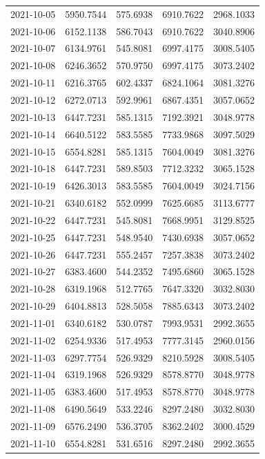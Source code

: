 {\begin{longtable}{lllll}
2021-10-05 & 5950.7544 & 575.6938 & 6910.7622 & 2968.1033 \\
2021-10-06 & 6152.1138 & 586.7043 & 6910.7622 & 3040.8906 \\
2021-10-07 & 6134.9761 & 545.8081 & 6997.4175 & 3008.5405 \\
2021-10-08 & 6246.3652 & 570.9750 & 6997.4175 & 3073.2402 \\
2021-10-11 & 6216.3765 & 602.4337 & 6824.1064 & 3081.3276 \\
2021-10-12 & 6272.0713 & 592.9961 & 6867.4351 & 3057.0652 \\
2021-10-13 & 6447.7231 & 585.1315 & 7192.3921 & 3048.9778 \\
2021-10-14 & 6640.5122 & 583.5585 & 7733.9868 & 3097.5029 \\
2021-10-15 & 6554.8281 & 585.1315 & 7604.0049 & 3081.3276 \\
2021-10-18 & 6447.7231 & 589.8503 & 7712.3232 & 3065.1528 \\
2021-10-19 & 6426.3013 & 583.5585 & 7604.0049 & 3024.7156 \\
2021-10-21 & 6340.6182 & 552.0999 & 7625.6685 & 3113.6777 \\
2021-10-22 & 6447.7231 & 545.8081 & 7668.9951 & 3129.8525 \\
2021-10-25 & 6447.7231 & 548.9540 & 7430.6938 & 3057.0652 \\
2021-10-26 & 6447.7231 & 555.2457 & 7257.3838 & 3073.2402 \\
2021-10-27 & 6383.4600 & 544.2352 & 7495.6860 & 3065.1528 \\
2021-10-28 & 6319.1968 & 512.7765 & 7647.3320 & 3032.8030 \\
2021-10-29 & 6404.8813 & 528.5058 & 7885.6343 & 3073.2402 \\
2021-11-01 & 6340.6182 & 530.0787 & 7993.9531 & 2992.3655 \\
2021-11-02 & 6254.9336 & 517.4953 & 7777.3145 & 2960.0156 \\
2021-11-03 & 6297.7754 & 526.9329 & 8210.5928 & 3008.5405 \\
2021-11-04 & 6319.1968 & 526.9329 & 8578.8770 & 3048.9778 \\
2021-11-05 & 6383.4600 & 517.4953 & 8578.8770 & 3048.9778 \\
2021-11-08 & 6490.5649 & 533.2246 & 8297.2480 & 3032.8030 \\
2021-11-09 & 6576.2490 & 536.3705 & 8362.2402 & 3000.4529 \\
2021-11-10 & 6554.8281 & 531.6516 & 8297.2480 & 2992.3655 \\

\end{longtable}}
